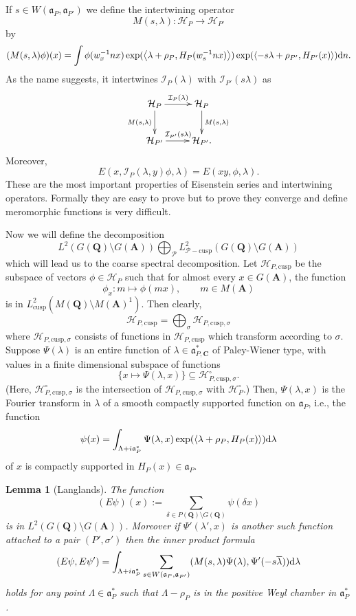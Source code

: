 \documentclass[11pt]{amsart}
\def\A{\mathbf A}
\def\C{\mathbf C}
\def\Q{\mathbf Q}
\def\HHH{\mathcal H}
\def\III{\mathcal I}
\def\PPP{\mathcal P}
\def\aaa{\mathfrak a}
\def\d{\text d}
\def\bs{\setminus} 			%
\def\cusp{\text{cusp}}
\def\Ltwo{L^2}
\def\sprod#1#2{\left\langle #1 , #2 \right\rangle}  %
\newtheorem{lemma}[theorem]{Lemma}
\theoremstyle{remark}
\begin{document}
If $s \in W(\aaa_P, \aaa_{P'})$ we define the intertwining operator
\[ M(s, \lambda) : \HHH_P \to \HHH_{P'} \]
by
\[ (M(s, \lambda)\phi)(x) = \int \phi(w_x^{-1}n x) \exp(\sprod{\lambda + \rho_P}{H_P(w_s^{-1}n x)})
				 \exp(\sprod{- s\lambda + \rho_{P'}}{H_{P'}(x)}) \d n. \]
As the name suggests, it intertwines $\III_P(\lambda)$ with $\III_{P'}(s\lambda)$ as
\[ \xymatrix{
	\HHH_P \ar[r]^{\III_P(\lambda)} \ar[d]_{M(s, \lambda)} & \HHH_P \ar[d]^{M(s, \lambda)} \\
	\HHH_{P'} \ar[r]^{\III_{P'}(s\lambda)} & \HHH_{P'}.
 } \]
Moreover,
\[ E(x, \III_P(\lambda, y)\phi, \lambda) = E(xy, \phi, \lambda). \]
These are the most important properties of Eisenstein series and intertwining operators. Formally they are easy to prove but to prove they converge and define meromorphic functions is very difficult. 

Now we will define the decomposition
\[ \Ltwo(G(\Q)\bs G(\A)) \bigoplus_\PPP \Ltwo_{\PPP-\cusp}(G(\Q)\bs G(\A)) \]
which will lead us to the coarse spectral decomposition. Let $\HHH_{P, \cusp}$ be the subspace of vectors $\phi \in \HHH_P$ such that for almost every $x \in G(\A)$, the function
\[ \phi_x : m \mapsto \phi(mx) , \qquad m \in M(\A) \]
is in $\Ltwo_{\cusp}(M(\Q)\bs M(\A)^1)$. Then clearly,
\[ \HHH_{P, \cusp} = \bigoplus_\sigma \HHH_{P, \cusp, \sigma} \]
where $\HHH_{P, \cusp, \sigma}$ consists of functions in $\HHH_{P, \cusp}$ which transform according to $\sigma$. Suppose $\Psi(\lambda)$ is an entire function of $\lambda \in \aaa_{P, \C}^*$ of Paley-Wiener type, with values in a finite dimensional subspace of functions
\[ \{ x \mapsto \Psi(\lambda, x) \} \subseteq \HHH_{P, \cusp, \sigma}^\circ. \]
(Here, $\HHH_{P, \cusp, \sigma}^\circ$ is the intersection of $\HHH_{P, \cusp, \sigma}$ with $\HHH_P^\circ$.) Then, $\Psi(\lambda, x)$ is the Fourier transform in $\lambda$ of a smooth compactly supported function on $\aaa_P$, i.e., the function
\[ \psi(x) = \int_{\Lambda + i\aaa_P^*} \Psi(\lambda, x) \exp(\sprod{\lambda + \rho_P}{H_P(x)}) \d \lambda \]
of $x$ is compactly supported in $H_P(x) \in \aaa_P$. 
\begin{lemma} [Langlands]
	The function 
	\[ (E\psi)(x) := \sum_{\delta \in P(\Q)\bs G(\Q)} \psi(\delta x) \]
	is in $\Ltwo(G(\Q)\bs G(\A))$. Moreover if $\Psi'(\lambda', x)$ is another such function attached to a pair $(P', \sigma')$ then the inner product formula
	\[ (E\psi, E\psi') = \int_{\Lambda + i\aaa_P^*} \sum_{s \in W(\aaa_P, \aaa_{P'})}
				(M(s, \lambda)\Psi(\lambda), \Psi'(-s\overline \lambda)) \d \lambda \]
	holds for any point $\Lambda \in \aaa_P^*$ such that $\Lambda - \rho_P$ is in the positive Weyl chamber in $\aaa_P^*$. 
\end{lemma}
\end{document}
